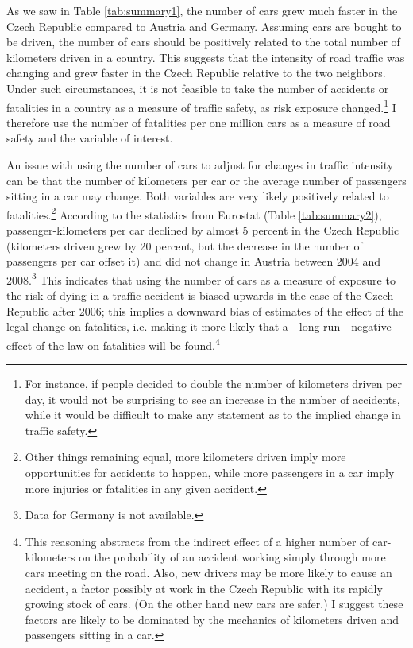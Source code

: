 \documentclass[12pt]{article}
\begin{document}
As we saw in Table \ref{tab:summary1}, the number of cars grew much faster in
the Czech Republic compared to Austria and Germany. Assuming cars are bought to
be driven, the number of cars should be positively related to the total number
of kilometers driven in a country.  This suggests that the intensity of road
traffic was changing and grew faster in the Czech Republic relative to the two
neighbors. Under such circumstances, it is not feasible to take the number of
accidents or fatalities in a country as a measure of traffic safety, as risk
exposure changed.\footnote{For instance, if people decided to double the number
  of kilometers driven per day, it would not be surprising to see an increase in
  the number of accidents, while it would be difficult to make any statement as
  to the implied change in traffic safety.}  I therefore use the number of
fatalities per one million cars as a measure of road safety and the variable of
interest.

An issue with using the number of cars to adjust for changes in traffic
intensity can be that the number of kilometers per car or the average number of
passengers sitting in a car may change. Both variables are very likely
positively related to fatalities.\footnote{Other things remaining equal, more
  kilometers driven imply more opportunities for accidents to happen, while more
  passengers in a car imply more injuries or fatalities in any given accident.}
According to the statistics from Eurostat (Table \ref{tab:summary2}),
passenger-kilometers per car declined by almost 5 percent in the Czech Republic
(kilometers driven grew by 20 percent, but the decrease in the number of
passengers per car offset it) and did not change in Austria between 2004 and
2008.\footnote{Data for Germany is not available.} This indicates that using the
number of cars as a measure of exposure to the risk of dying in a traffic
accident is biased upwards in the case of the Czech Republic after 2006; this
implies a downward bias of estimates of the effect of the legal change on
fatalities, i.e.  making it more likely that a---long run---negative effect of
the law on fatalities will be found.\footnote{This reasoning abstracts from the
  indirect effect of a higher number of car-kilometers on the probability of an
  accident working simply through more cars meeting on the road.  Also, new
  drivers may be more likely to cause an accident, a factor possibly at work in
  the Czech Republic with its rapidly growing stock of cars.  (On the other hand
  new cars are safer.) I suggest these factors are likely to be dominated by the
  mechanics of kilometers driven and passengers sitting in a car.}
\end{document}
